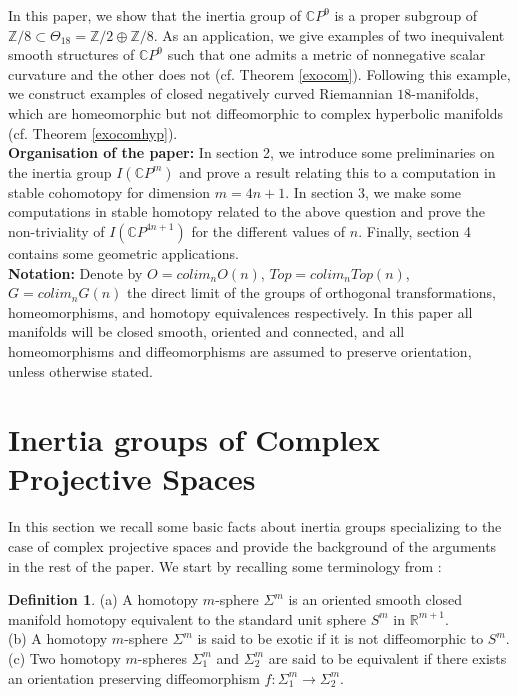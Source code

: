 \documentclass[a4paper,leqno,12pt]{amsart}
\theoremstyle{plain}
\theoremstyle{definition}
\newtheorem{defn}[theorem]{Definition}
\numberwithin{equation}{section}
\begin{document}
In this paper, we show that the inertia group of ${\mathbb{C}} P^9$ is a proper subgroup of ${\mathbb{Z}}/8\subset \Theta_{18}={\mathbb{Z}}/2\oplus {\mathbb{Z}}/8$.   As an application, we give examples of two inequivalent smooth structures of $\mathbb{C}P^{9}$ such that one admits a metric of nonnegative scalar curvature and the other does not (cf. Theorem \ref{exocom}). Following this example, we construct examples of closed negatively curved Riemannian $18$-manifolds, which are homeomorphic but not diffeomorphic to complex hyperbolic manifolds (cf. Theorem \ref{exocomhyp}).\\

\noindent
{\bf Organisation of the paper:} In section 2, we introduce some preliminaries on the inertia group $I(\mathbb{C}P^m)$ and prove a result relating this to a computation in stable cohomotopy for dimension $m=4n+1$. In section 3, we make some computations in stable homotopy related to the above question and prove the non-triviality of $I(\mathbb{C}P^{4n+1})$ for the different values of $n$. Finally, section 4 contains some geometric applications.\\

\noindent
{\bf Notation: } Denote by $O={\mathit{colim}}_n O(n)$, $Top= {\mathit{colim}}_n Top(n)$, $G={\mathit{colim}}_n G(n)$ the direct limit of the groups of orthogonal transformations, homeomorphisms, and homotopy equivalences respectively. In this paper all manifolds will be closed smooth, oriented and connected, and all homeomorphisms and diffeomorphisms are assumed to preserve orientation, unless otherwise stated.

\section{Inertia groups of Complex Projective Spaces}
In this section we recall some basic facts about inertia groups specializing to the case of complex projective spaces and provide the background of the arguments in the rest of the paper. We start by recalling some terminology from \cite{KM63}:
\begin{defn}
(a) A homotopy $m$-sphere $\Sigma^m$ is an oriented smooth closed manifold homotopy equivalent to the standard unit sphere $S^m$ in $\mathbb{R}^{m+1}$.\\
(b) A homotopy $m$-sphere $\Sigma^m$ is said to be exotic if it is not diffeomorphic to $S^m$.\\
(c) Two homotopy $m$-spheres $\Sigma^{m}_{1}$ and $\Sigma^{m}_{2}$ are said to be equivalent if there exists an orientation preserving diffeomorphism $f:\Sigma^{m}_{1}\to \Sigma^{m}_{2}$.
\end{defn}
\end{document}
